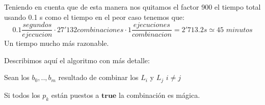 Teniendo en cuenta que de esta manera nos quitamos el factor 900 el tiempo total
usando 0.1 s como el tiempo en el peor caso tenemos que:
$$ 0.1\frac{segundos}{ejecucion} \cdot 27'132 combinaciones  \cdot 1 \frac{ejecuciones}{combinacion}=2'713.2s \simeq 45 \textit{ minutos}$$
Un tiempo mucho más razonable.

\vspace{0.25cm}
Describimos aquí el algoritmo con más detalle:
\vspace{0.25cm}

\begin{algo}

 \hspace{0.25cm}	Sean los $b_0,..,b_{m}$ resultado de combinar los $L_i$ y $L_j$ $i \neq j$  \;
\end{algo}
Si todos los $p_k$ están puestos a $\textbf{true}$ la combinación es mágica.
